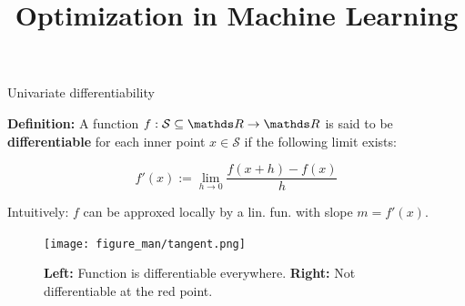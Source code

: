 \documentclass[11pt,compress,t,notes=noshow, xcolor=table]{beamer}
\title{Optimization in Machine Learning}
\begin{document}



\begin{vbframe}{Univariate differentiability}

\textbf{Definition:} A function $f: \mathcal{S} \subseteq \R \to \R$ is said to be \textbf{differentiable} for each inner point $x \in \mathcal{S}$ if the following limit exists:

$$
f'(x) := \lim_{h \to 0} \frac{f(x + h) - f(x)}{h}
$$

Intuitively: $f$ can be approxed locally by a lin. fun. with slope $m = f'(x)$.

\begin{figure}
    \centering
    \texttt{[image: figure\_man/tangent.png]}
    \caption*{\footnotesize \textbf{Left:} Function is differentiable everywhere.
        \textbf{Right:} Not differentiable at the red point. }
\end{figure}








\end{vbframe}
\end{document}
